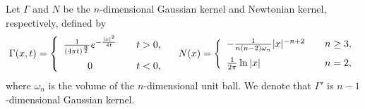 \documentclass{amsart}
\numberwithin{equation}{section}
\newcommand{\om}{{ \omega  }}
\newcommand{\Ga}{\Gamma}
\begin{document}
Let $\Ga$ and $N$ be  the $n $-dimensional Gaussian kernel  and  Newtonian kernel, respectively, defined by
\begin{align*}%
\Ga(x,t) = \left\{ \begin{array}{cc}\vspace{2mm}
\frac1{(4\pi t)^{\frac{n}2}} e^{-\frac{ |x|^2}{4t}}& \quad t > 0,\\
0 &\quad t < 0,
\end{array}
\right.
\quad N(x) = \left\{\begin{array}{ll}\vspace{2mm}
-\frac1{n(n -2)\om_n} |x|^{-n +2} &\quad n \geq 3,\\
\frac1{2\pi} \ln |x| &  \quad n =2,
\end{array}
\right.
\end{align*}
where \(\omega_n\) is the volume of the \(n\)-dimensional unit ball. We denote that $\Ga'$  is  $n-1 $-dimensional Gaussian kernel.


 



  
 
\end{document}
